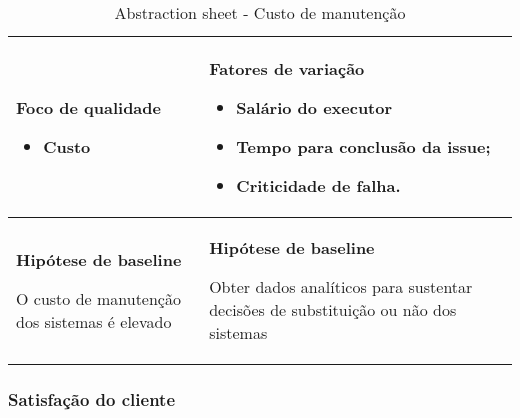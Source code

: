 \begin{table}[H]
\centering
\begin{tabular}{|p{4cm}|p{4cm}|}
\hline
	\begin{center}
	\textbf{Foco de qualidade}
	\end{center}

	\begin{itemize}
		\item Custo
	\end{itemize}

	&

	\begin{center}
	\textbf{Fatores de variação}
	\end{center}

	\begin{itemize}
		\item{Salário do executor}
		\item{Tempo para conclusão da issue;}
		\item{Criticidade de falha.}
	\end{itemize}

	\\ \hline
	\begin{center}
	\textbf{Hipótese de baseline}
	\end{center}
	O custo de manutenção dos sistemas é elevado

	&

	\begin{center}
	\textbf{Hipótese de baseline}
	\end{center}

	Obter dados analíticos para sustentar decisões de substituição ou não dos sistemas
	\\ \hline
\end{tabular}
\caption{Abstraction sheet - Custo de manutenção}
\label{tab:manutencao_sheet}
\end{table}

\subsubsection{Satisfação do cliente}

